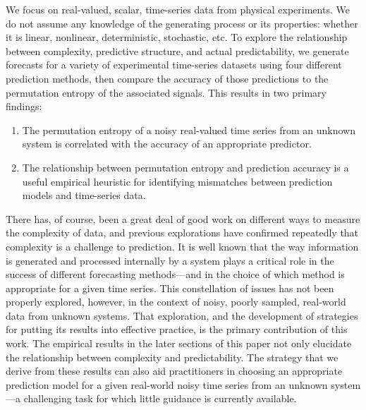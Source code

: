 We focus on real-valued, scalar, time-series data from physical experiments.
%
%
We do not assume any knowledge of the generating process or its
properties: whether it is linear, nonlinear, deterministic,
stochastic, etc.  To explore the relationship between complexity,
predictive structure, and actual predictability, we generate forecasts
for a variety of experimental time-series datasets using four
different prediction methods, then compare the accuracy of those
predictions to the permutation entropy of the associated signals.
This results in two primary findings:
% 
\begin{enumerate}

\item The permutation entropy of a noisy real-valued time series from
  an unknown system is correlated with the accuracy of an appropriate
  predictor.

\item The relationship between permutation entropy and prediction
  accuracy is a useful empirical heuristic for identifying mismatches
  between prediction models and time-series data.

\end{enumerate}
% 
There has, of course, been a great deal of good work on different ways
to measure the complexity of data, and previous explorations have
confirmed repeatedly that complexity is a challenge to prediction.  It
is well known that the way information is generated and processed
internally by a system plays a critical role in the success of
different forecasting methods---and in the choice of which method is
appropriate for a given time series.  This constellation of issues has
not been properly explored, however, in the context of noisy, poorly
sampled, real-world data from unknown systems.  That exploration, and
the development of strategies for putting its results into effective
practice, is the primary contribution of this work.  The empirical
results in the later sections of this paper not only elucidate the
relationship between complexity and predictability.  The strategy that
we derive from these results can also aid practitioners in choosing an
appropriate prediction model for a given real-world noisy time series
from an unknown system---a challenging task for which little guidance
is currently available.

